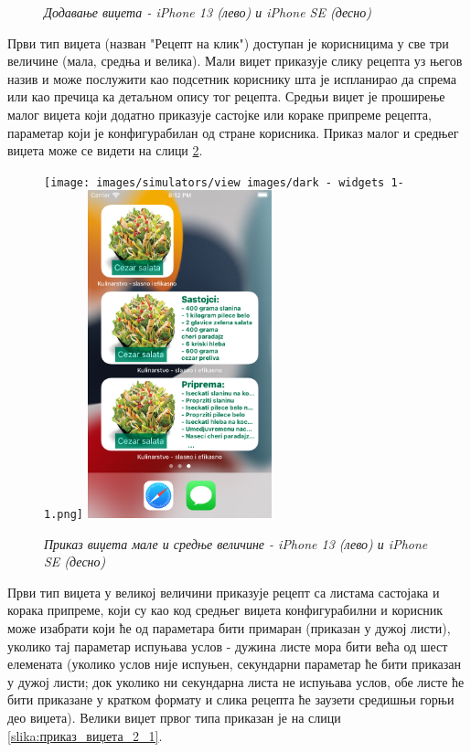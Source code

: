 \documentclass[12pt,oneside]{memoir}
\begin{document}
\begin{figure} [H]
    \caption{\textit{Додавање виџета - iPhone 13 (лево) и iPhone SE (десно)}}
    \label{slika:додавање_виџета_1}
\end{figure}

\indent Први тип виџета (назван "Рецепт на клик") доступан је корисницима у све три величине (мала, средња и велика). Мали виџет приказује слику рецепта уз његов назив и може послужити као подсетник кориснику шта је испланирао да спрема или као пречица ка детаљном опису тог рецепта. Средњи виџет је проширење малог виџета који додатно приказује састојке или кораке припреме рецепта, параметар који је конфигурабилан од стране корисника. Приказ малог и средњег виџета може се видети на слици \ref{slika:приказ_виџета_1_1}.

\begin{figure} [H]
    \centering
    \captionsetup{justification=centering}
    \texttt{[image: images/simulators/view images/dark - widgets 1-1.png]}
    \hfill
    \includegraphics[width=0.475\textwidth]{images/simulators/view images/light - widgets 1-1.png} 
    \caption{\textit{Приказ виџета мале и средње величине - iPhone 13 (лево) и iPhone SE (десно)}}
    \label{slika:приказ_виџета_1_1}
\end{figure}

\indent Први тип виџета у великој величини приказује рецепт са листама састојака и корака припреме, који су као код средњег виџета конфигурабилни и корисник може изабрати који ће од параметара бити примаран (приказан у дужој листи), уколико тај параметар испуњава услов - дужина листе мора бити већа од шест елемената (уколико услов није испуњен, секундарни параметар ће бити приказан у дужој листи; док уколико ни секундарна листа не испуњава услов, обе листе ће бити приказане у кратком формату и слика рецепта ће заузети средишњи горњи део виџета). Велики виџет првог типа приказан је на слици \ref{slika:приказ_виџета_2_1}.
\end{document}
